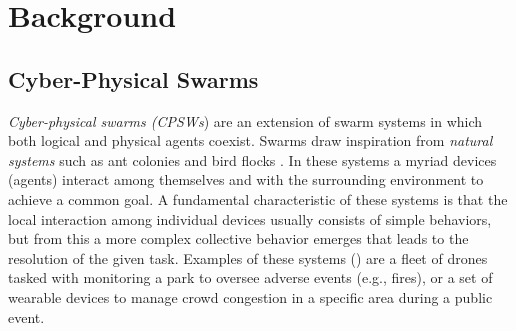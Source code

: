 \documentclass[12pt,a4paper,openright,twoside]{book}
\begin{document}
\chapter{Background}
\label{chap:background}

\section{Cyber-Physical Swarms}

\emph{Cyber-physical swarms (CPSWs}) are an extension of swarm systems in which both logical and
    physical agents coexist. Swarms draw inspiration from \emph{natural systems} such as ant colonies 
    and bird flocks \cite{tan2013swarm, roy2014nature, bonabeau1999swarm}. In these systems a myriad devices (agents) interact among themselves and with the surrounding 
    environment to achieve a common goal. A fundamental characteristic of these systems is that the local 
    interaction among individual devices usually consists of simple behaviors, but from this a more 
    complex collective behavior emerges that leads to the resolution of the given task. Examples of these systems () are a fleet of drones tasked with monitoring a park to 
    oversee adverse events (e.g., fires), or a set of wearable devices to manage crowd congestion in a specific area during a public event.
\end{document}
